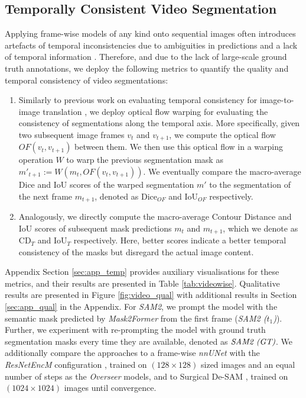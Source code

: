 %
%
%

\subsection{Temporally Consistent Video Segmentation}
\label{sec:vid_seg}

Applying frame-wise models of any kind onto sequential images often introduces artefacts of temporal inconsistencies due to ambiguities in predictions and a lack of temporal information \cite{rivoir2021long,frisch2023temporally}. Therefore, and due to the lack of large-scale ground truth annotations, we deploy the following metrics to quantify the quality and temporal consistency of video segmentations:
\begin{enumerate}
    \item Similarly to previous work on evaluating temporal consistency for image-to-image translation \cite{rivoir2021long,frisch2023temporally}, we deploy optical flow warping for evaluating the consistency of segmentations along the temporal axis. More specifically, given two subsequent image frames $v_t$ and $v_{t+1}$, we compute the optical flow $OF(v_t,v_{t+1})$ between them. We then use this optical flow in a warping operation $W$ to warp the previous segmentation mask as $m'_{t+1} := W(m_t,OF(v_t,v_{t+1}))$. We eventually compare the macro-average Dice and IoU scores of the warped segmentation $m'$ to the segmentation of the next frame $m_{t+1}$, denoted as $\text{Dice}_{OF}$ and $\text{IoU}_{OF}$ respectively.
    \item Analogously, we directly compute the macro-average Contour Distance and IoU scores of subsequent mask predictions $m_t$ and $m_{t+1}$, which we denote as $\text{CD}_{T}$ and $\text{IoU}_{T}$ respectively. Here, better scores indicate a better temporal consistency of the masks but disregard the actual image content.
\end{enumerate}
Appendix Section \ref{sec:app_temp} provides auxiliary visualisations for these metrics, and their results are presented in Table \ref{tab:videowise}. Qualitative results are presented in Figure \ref{fig:video_qual} with additional results in Section \ref{sec:app_qual} in the Appendix. For \emph{SAM2}, we prompt the model with the semantic mask predicted by \emph{Mask2Former} from the first frame (\emph{SAM2 ($t_1$)}). Further, we experiment with re-prompting the model with ground truth segmentation masks every time they are available, denoted as $\emph{SAM2 (GT)}$. We additionally compare the approaches to a frame-wise \emph{nnUNet} with the \emph{ResNetEncM} configuration \cite{isensee2021nnu}, trained on $(128 \times 128)$ sized images and an equal number of steps as the \emph{Overseer} models, and to Surgical De-SAM \cite{sheng2024surgical}, trained on $(1024 \times 1024)$ images until convergence.

